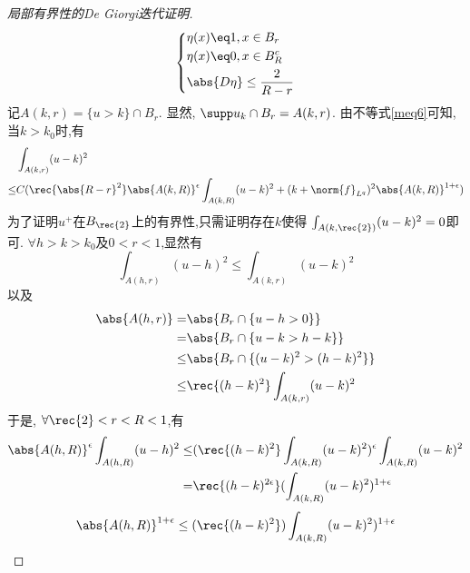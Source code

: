 \begin{proof}[局部有界性的De Giorgi迭代证明]
    \begin{equation}
        \left\{
        \begin{aligned}
            & \eta(x) \eq 1, x \in B_r \\
            & \eta(x) \eq 0, x \in B_R^c\\
            & \abs{D\eta} \le \frac{2}{R-r}
        \end{aligned}
        \right.
    \end{equation}
    记$A(k,r)=\{u>k\} \cap B_r$. 显然, $\supp u_k \cap B_r = A(k,r)$. 由不等式\eqref{meq6}可知, 当$k>k_0$时,有
    \begin{equation}\label{ss}
        \begin{split}
            &\int_{A(k,r)} (u-k)^2 \\
            \le & C( \rec{\abs{R-r}^2} \abs{A(k,R)}^\epsilon\int_{A(k,R)}(u-k)^2 + (k+\norm{f}_{L^q})^2\abs{A(k,R)}^{1+\epsilon})
        \end{split}
    \end{equation}
    为了证明$u^+$在$B_{\rec{2}}$上的有界性,只需证明存在$k$使得 $\int_{A(k,\rec{2})} (u-k)^2=0$即可.  $\forall h > k > k_0$及$ 0 < r < 1$,显然有
    \begin{equation}
        \int_{A(h,r)} (u-h)^2 \le \int_{A(k,r)}(u-k)^2
    \end{equation}
    以及
    \begin{equation}
        \begin{split}
            \abs{A(h,r)} = &\abs{B_r \cap \{u-h>0\}} \\
            = &\abs{B_r \cap \{u-k > h-k\}} \\
            \le  & \abs{B_r \cap \{(u-k)^2 > (h-k)^2\}}\\
            \le & \rec{(h-k)^2}\int_{A(k,r)}(u-k)^2
        \end{split}
    \end{equation}
    于是, $\forall \rec{2} < r < R <1$,有
    \begin{equation} \label{s1}
        \begin{split}
            \abs{A(h,R)}^\epsilon \int_{A(h,R)}(u-h)^2 \le & (\rec{(h-k)^2}\int_{A(k,R)}(u-k)^2)^\epsilon\int_{A(k,R)} (u-k)^2\\
            = &\rec{(h-k)^{2\epsilon}} (\int_{A(k,R)}(u-k)^2)^{1+\epsilon}
        \end{split}
    \end{equation}
    \begin{equation} \label{s2}
        \abs{A(h,R)}^{1+\epsilon} \le (\rec{(h-k)^2})\int_{A(k,R)}(u-k)^2)^{1+\epsilon}

\end{equation}
\end{proof}
